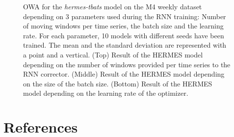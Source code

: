\documentclass[review]{elsarticle}
\begin{document}
\begin{figure}
\caption{OWA for the \textit{hermes-tbats} model on the M4 weekly dataset depending on 3 parameters used during the RNN training: Number of moving windows per time series, the batch size and the learning rate. For each parameter, 10 models with different seeds have been trained. The mean and the standard deviation are represented with a point and a vertical. (Top) Result of the HERMES model depending on the number of windows provided per time series to the RNN corrector. (Middle) Result of the HERMES model depending on the size of the batch size. (Bottom) Result of the HERMES model depending on the learning rate of the optimizer.}
\label{fig:m4parameter}
\end{figure}

\section*{References}


\end{document}

